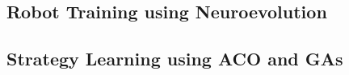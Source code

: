 \subsection{Robot Training using Neuroevolution}

\clearpage
\subsection{Strategy Learning using ACO and GAs}

